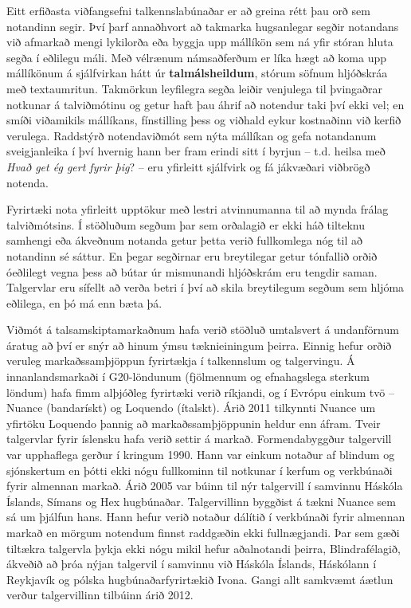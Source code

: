 \documentclass{../../metanetpaper}
\begin{document}
\begin{multicols}{2}
Eitt erfiðasta viðfangsefni talkennslabúnaðar er að greina rétt þau orð sem notandinn segir. Því þarf annaðhvort að takmarka hugsanlegar segðir notandans við afmarkað mengi lykilorða eða byggja upp mállíkön sem ná yfir stóran hluta segða í eðlilegu máli. Með vélrænum námsaðferðum er líka hægt að koma upp mállíkönum á sjálfvirkan hátt úr \textbf{talmálsheildum}, stórum söfnum hljóðskráa með textaumritun. Takmörkun leyfilegra segða leiðir venjulega til þvingaðrar notkunar á talviðmótinu og getur haft þau áhrif að notendur taki því ekki vel; en smíði viðamikils mállíkans, fínstilling þess og viðhald eykur kostnaðinn við kerfið verulega. Raddstýrð notendaviðmót sem nýta mállíkan og gefa notandanum sveigjanleika í því hvernig hann ber fram erindi sitt í byrjun -- t.d. heilsa með \textit{Hvað get ég gert fyrir þig}? -- eru yfirleitt sjálfvirk og fá jákvæðari viðbrögð notenda.

Fyrirtæki nota yfirleitt upptökur með lestri atvinnumanna til að mynda frálag talviðmótsins. Í stöðluðum segðum þar sem orðalagið er ekki háð tilteknu samhengi eða ákveðnum notanda getur þetta verið fullkomlega nóg til að notandinn sé sáttur. En þegar segðirnar eru breytilegar getur tónfallið orðið óeðlilegt vegna þess að bútar úr mismunandi hljóðskrám eru tengdir saman. Talgervlar eru sífellt að verða betri í því að skila breytilegum segðum sem hljóma eðlilega, en þó má enn bæta þá.

Viðmót á talsamskiptamarkaðnum hafa verið stöðluð umtalsvert á undanförnum áratug að því er snýr að hinum ýmsu tæknieiningum þeirra. Einnig hefur orðið veruleg markaðssamþjöppun fyrirtækja í talkennslum og talgervingu. Á innanlandsmarkaði í G20-löndunum (fjölmennum og efnahagslega sterkum löndum) hafa fimm alþjóðleg fyrirtæki verið ríkjandi, og í Evrópu einkum tvö -- Nuance (bandarískt) og Loquendo (ítalskt). Árið 2011 tilkynnti Nuance um yfirtöku Loquendo þannig að markaðssamþjöppunin heldur enn áfram.
Tveir talgervlar fyrir íslensku hafa verið settir á markað. Formendabyggður talgervill var upphaflega gerður í kringum 1990. Hann var einkum notaður af blindum og sjónskertum en þótti ekki nógu fullkominn til notkunar í kerfum og verkbúnaði fyrir almennan markað. 
Árið 2005 var búinn til nýr talgervill í samvinnu Háskóla Íslands, Símans og Hex hugbúnaðar. Talgervillinn byggðist á tækni Nuance sem sá um þjálfun hans. Hann hefur verið notaður dálítið í verkbúnaði fyrir almennan markað en mörgum notendum finnst raddgæðin ekki fullnægjandi. Þar sem gæði tiltækra talgervla þykja ekki nógu mikil hefur aðalnotandi þeirra, Blindrafélagið, ákveðið að þróa nýjan talgervil í samvinnu við Háskóla Íslands, Háskólann í Reykjavík og pólska hugbúnaðarfyrirtækið Ivona. Gangi allt samkvæmt áætlun verður talgervillinn tilbúinn árið 2012\cite{tal1}.


\end{multicols}
\end{document}
